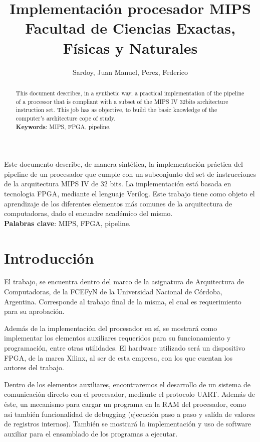 \documentclass[12pt]{article}
\title{Implementación procesador MIPS\\ Facultad de Ciencias Exactas, Físicas y Naturales}
\author{Sardoy, Juan Manuel\inst{1}, Perez, Federico\inst{1}}
\begin{document}
 

\maketitle

\begin{resumen}
  Este documento describe, de manera sintética, la implementación práctica del pipeline de un procesador que cumple con un subconjunto del set de instrucciones de la arquitectura MIPS IV de 32 bits. La implementación está basada en tecnologia FPGA, mediante el lenguaje Verilog. Este trabajo tiene como objeto el aprendizaje de los diferentes elementos más comunes de la arquitectura de computadoras, dado el encuadre académico del mismo.\\
  \textbf{Palabras clave}: MIPS, FPGA, pipeline.
\end{resumen}

\begin{abstract}
  This document describes, in a synthetic way, a practical implementation of the pipeline of a processor that is compliant with a subset of the MIPS IV 32bits architecture instruction set. This job has as objective, to build the basic knowledge of the computer's architecture cope of study. \\
  \textbf{Keywords}: MIPS, FPGA, pipeline.
\end{abstract}

\section{Introducción}

El trabajo, se encuentra dentro del marco de la asignatura de Arquitectura de Computadoras, de la FCEFyN de la Universidad Nacional de Córdoba, Argentina. Corresponde al trabajo final de la misma, el cual es requerimiento para su aprobación. 

Además de la implementación del procesador en sí, se mostrará como implementar los elementos auxiliares requeridos para su funcionamiento y programación, entre otras utilidades. El hardware utilizado será un dispositivo FPGA, de la marca Xilinx, al ser de esta empresa, con los que cuentan los autores del trabajo. 

Dentro de los elementos auxiliares, encontraremos el desarrollo de un sistema de comunicación directo con el procesador, mediante el protocolo UART. Además de éste, un mecanismo para cargar un programa en la RAM del procesador, como asi también funcionalidad de debugging (ejecución paso a paso y salída de valores de registros internos). También se mostrará la implementación y uso de software auxiliar para el ensamblado de los programas a ejecutar. 
\end{document}
